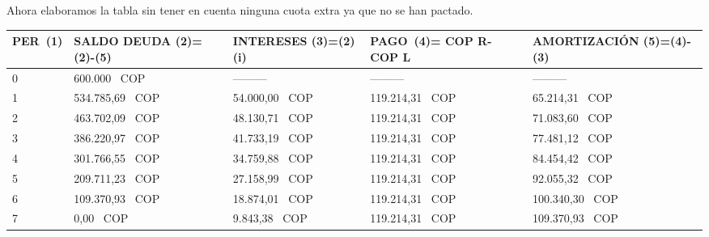 
\newpage
Ahora elaboramos la tabla sin tener en cuenta ninguna cuota extra ya que no se han pactado.

\begin{spacing}{1.1}
	\begin{center}
		\begin{tabular}{|p{1cm}|p{2cm}|p{2cm}|p{2cm}|p{3cm}|}
			\hline
			\textbf{PER\ (1)} & \textbf{SALDO DEUDA (2)=(2)-(5)} & \textbf{INTERESES  (3)=(2)(i)} & \textbf{PAGO\ (4)= COP  R- COP  L } & \textbf{AMORTIZACIÓN  (5)=(4)-(3)} \\ \hline
			
			0                 &   600.000 \ COP                     & ---------                       & ---------                   & ---------                          \\ \hline
			1                 &   534.785,69 \ COP                     &  54.000,00 \ COP                    &  119.214,31 \ COP                &  65.214,31 \ COP                        \\ \hline
			2                 &  463.702,09 \ COP                     &  48.130,71 \ COP                    &  119.214,31 \ COP                &    71.083,60 \ COP                        \\ \hline
			3                 &  386.220,97 \ COP                     &  41.733,19 \ COP                     &  119.214,31 \ COP                &   77.481,12 \ COP                        \\ \hline
			4                 &  301.766,55 \ COP                     &  34.759,88 \ COP                     &  119.214,31 \ COP                &  84.454,42 \ COP                        \\ \hline
			5                 &  209.711,23 \ COP                     &  27.158,99 \ COP                     &  119.214,31 \ COP                &   92.055,32 \ COP                        \\ \hline
			6                 &  109.370,93 \ COP                     &  18.874,01 \ COP                     &  119.214,31 \ COP                &  100.340,30 \ COP                       \\ \hline
			7                 &  0,00 \ COP                           &  9.843,38 \ COP                      &  119.214,31 \ COP                &  109.370,93 \ COP                       \\ \hline
		\end{tabular}
	\end{center}
\end{spacing}


